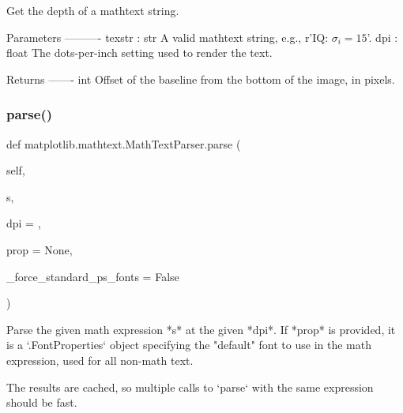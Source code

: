 \begin{DoxyVerb}Get the depth of a mathtext string.

Parameters
----------
texstr : str
    A valid mathtext string, e.g., r'IQ: $\sigma_i=15$'.
dpi : float
    The dots-per-inch setting used to render the text.

Returns
-------
int
    Offset of the baseline from the bottom of the image, in pixels.
\end{DoxyVerb}
 \mbox{\label{classmatplotlib_1_1mathtext_1_1MathTextParser_a9abf5e81b0c41d431d630a53ea324624}} 
\subsubsection{\texorpdfstring{parse()}{parse()}}
{\footnotesize\ttfamily def matplotlib.\+mathtext.\+Math\+Text\+Parser.\+parse (\begin{DoxyParamCaption}\item[{}]{self,  }\item[{}]{s,  }\item[{}]{dpi = {},  }\item[{}]{prop = {\ttfamily None},  }\item[{}]{\+\_\+force\+\_\+standard\+\_\+ps\+\_\+fonts = {\ttfamily False} }\end{DoxyParamCaption})}

\begin{DoxyVerb}Parse the given math expression *s* at the given *dpi*.  If *prop* is
provided, it is a `.FontProperties` object specifying the "default"
font to use in the math expression, used for all non-math text.

The results are cached, so multiple calls to `parse`
with the same expression should be fast.
\end{DoxyVerb}
 \mbox{\label{classmatplotlib_1_1mathtext_1_1MathTextParser_a2ab905102ebba2a55f889b195ab8c068}} 
